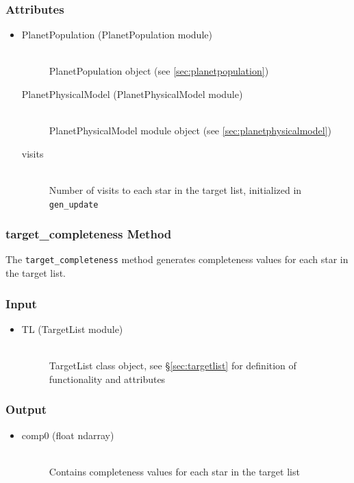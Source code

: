 \documentclass[cleanfoot]{asme2ej}
\begin{document}
\subsubsection*{Attributes}
\begin{itemize}
\item 
\begin{description}
    \item[PlanetPopulation (PlanetPopulation module)] \hfill \\ PlanetPopulation object (see \ref{sec:planetpopulation})
    \item[PlanetPhysicalModel (PlanetPhysicalModel module)] \hfill \\ PlanetPhysicalModel module object (see \ref{sec:planetphysicalmodel}) 
    \item[visits] \hfill \\ Number of visits to each star in the target list, initialized in \verb+gen_update+
\end{description}
\end{itemize}

\subsubsection{target\_completeness Method}
\label{sec:targetcompletenesstask}
The \verb+target_completeness+ method generates completeness values for each star in the target list.

\subsubsection*{Input}
\begin{itemize}
\item 
\begin{description}
    \item[TL (TargetList module)] \hfill \\ TargetList class object, see \S\ref{sec:targetlist} for definition of functionality and attributes
\end{description}
\end{itemize}

\subsubsection*{Output}
\begin{itemize}
\item 
\begin{description}
    \item[comp0 (float ndarray)] \hfill \\ Contains completeness values for each star in the target list
\end{description}
\end{itemize}
\end{document}
